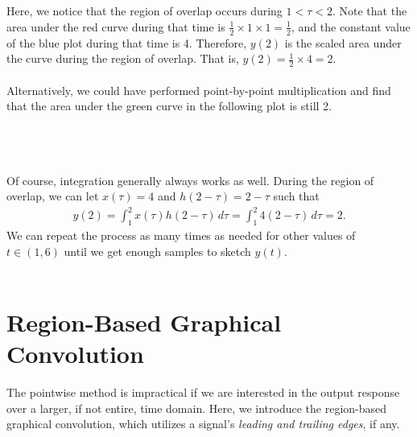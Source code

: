 \documentclass{report}
\begin{document}
\begin{solution}
    \\ \\
    Here, we notice that the region of overlap occurs during $1<\tau<2$. Note that the area under the red curve during that time is $\frac{1}{2}\times 1 \times 1 = \frac{1}{2}$, and the constant value 
    of the blue plot during that time is 4. Therefore, $y(2)$ is the scaled area under the curve during the region of overlap. That is, $y(2)=\frac{1}{2}\times 4=2$. 
    \\ \\ 
    Alternatively, we could have performed point-by-point multiplication and find that the area under the green curve in the following plot is still 2. \\ \\
    \\ \\ 
    Of course, integration generally always works as well. During the region of overlap, we can let $x(\tau)=4$ and $h(2-\tau)=2-\tau$ such that 
    \begin{align*}
        y(2) = \int_{1}^{2} x(\tau)h(2-\tau) \,d\tau = \int_{1}^{2} 4(2-\tau) \,d\tau = 2.
    \end{align*}
    We can repeat the process as many times as needed for other values of $t\in(1,6)$ until we get enough samples to sketch $y(t)$.
    \\ \\
\end{solution}

\section{Region-Based Graphical Convolution}
The pointwise method is impractical if we are interested in the output response over a larger, if not entire, time domain. Here, we introduce the region-based 
graphical convolution, which utilizes a signal's \emph{leading and trailing edges}, if any. 
\end{document}
